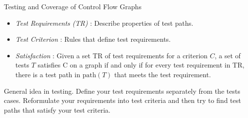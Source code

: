 \documentclass[handout]{beamer}
\newcommand{\Path}{\mathrm{path}}
\begin{document}
 \begin{frame}{Testing and Coverage of  Control Flow Graphs}
   \begin{itemize}
   \item {\em Test Requirements (TR)} : Describe properties of test paths.
     \item {\em Test Criterion} : Rules that define test requirements.
     \item {\em Satisfaction} : Given a set TR of test requirements
       for a criterion $C$, a set of tests $T$ satisfies C on a graph if
       and only if for every test requirement in TR, there is a test
       path in $\Path(T)$ that meets the test requirement.
   \end{itemize}
General idea in testing. Define your test requirements separately from
the tests cases. Reformulate your requirements  into test
criteria and then try to find test paths that satisfy your test
criteria.
 \end{frame}
\end{document}
